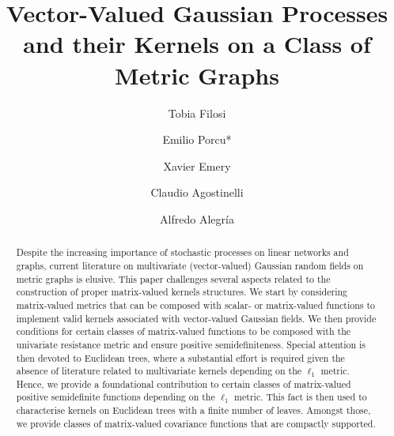 \documentclass[12pt]{article}
\theoremstyle{plain}
\theoremstyle{remark}
\begin{document}
\title{Vector-Valued Gaussian Processes and their Kernels on a Class of Metric Graphs}



\author[A]{Tobia Filosi}%
\author[B]{Emilio Porcu*}%
\author[C]{Xavier Emery}%
\author[A]{Claudio Agostinelli}%
\author[D]{Alfredo Alegría}%

\maketitle

\begin{abstract}
    Despite the increasing importance of stochastic processes on linear networks and graphs, 
    current literature on multivariate (vector-valued) Gaussian random fields on metric graphs is elusive. This paper challenges several aspects related to the construction of proper matrix-valued kernels structures. We start by considering matrix-valued metrics that can be composed with scalar- or matrix-valued functions to implement valid kernels associated with vector-valued Gaussian fields. We then provide conditions for certain classes of matrix-valued functions to be composed with the univariate resistance metric and ensure positive semidefiniteness. Special attention is then devoted to Euclidean trees, where a substantial effort is required given the absence of literature related to multivariate kernels depending on the $\ell_1$ metric. Hence, we provide a foundational contribution to certain classes of matrix-valued positive semidefinite functions depending on the $\ell_1$ metric. This fact is then used to characterise kernels on Euclidean trees with a finite number of leaves. Amongst those, we provide classes of matrix-valued covariance functions that are compactly supported.
\end{abstract}
\end{document}
